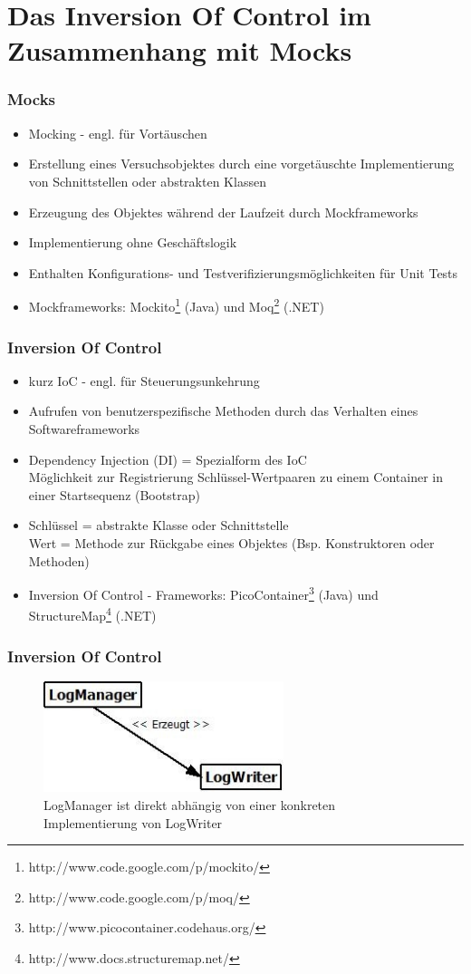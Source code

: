 \documentclass{beamer}
\begin{document}
\section{Das Inversion Of Control im Zusammenhang mit Mocks}
\begin{frame}
\frametitle{Mocks}
\begin{itemize}
\item Mocking - engl. für Vortäuschen
\item Erstellung eines Versuchsobjektes durch eine vorgetäuschte Implementierung von Schnittstellen oder abstrakten Klassen
\item Erzeugung des Objektes während der Laufzeit durch Mockframeworks
\item Implementierung ohne Geschäftslogik
\item Enthalten Konfigurations- und Testverifizierungsmöglichkeiten für Unit Tests
\item Mockframeworks: Mockito\footnote{http://www.code.google.com/p/mockito/} (Java) und Moq\footnote{http://www.code.google.com/p/moq/} (.NET)
\end{itemize}
\end{frame}

\begin{frame}
\frametitle{Inversion Of Control}
\begin{itemize}
\item kurz IoC - engl. für Steuerungsunkehrung
\item Aufrufen von benutzerspezifische Methoden durch das Verhalten eines Softwareframeworks
\item Dependency Injection (DI) = Spezialform des IoC\\Möglichkeit zur Registrierung Schlüssel-Wertpaaren zu einem Container in einer Startsequenz (Bootstrap)
\item Schlüssel = abstrakte Klasse oder Schnittstelle\\Wert = Methode zur Rückgabe eines Objektes (Bsp. Konstruktoren oder Methoden)
\item Inversion Of Control - Frameworks:
PicoContainer\footnote{http://www.picocontainer.codehaus.org/} (Java) und StructureMap\footnote{http://www.docs.structuremap.net/} (.NET)
\end{itemize}
\end{frame}

\begin{frame}
\frametitle{Inversion Of Control}
\begin{figure}[htbp]
\includegraphics[width=7cm]{logging_closeCoupled.jpg}
\caption{LogManager ist direkt abhängig von einer konkreten Implementierung von LogWriter}
\end{figure}
\end{frame}
\end{document}
